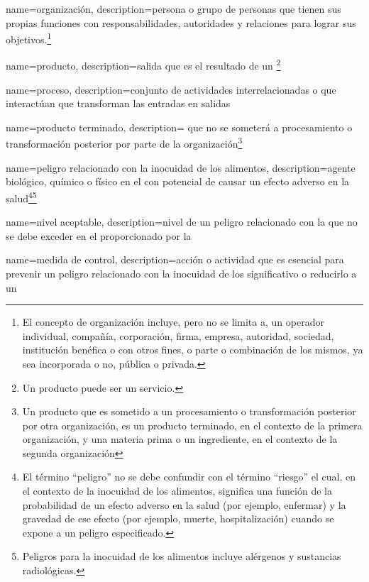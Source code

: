 {
    name=organización,
    description={persona o grupo de personas que tienen sus propias funciones con responsabilidades, autoridades y relaciones para lograr sus objetivos.\footnote{El concepto de organización incluye, pero no se limita a, un operador individual, compañía, corporación, firma, empresa, autoridad, sociedad, institución benéfica o con otros fines, o parte o combinación de los mismos, ya sea incorporada o no, pública o privada.}}
}

{
    name=producto,
    description={salida que es el resultado de un \footnote{Un producto puede ser un servicio.}}
}

{
    name=proceso,
    description={conjunto de actividades interrelacionadas o que interactúan que transforman las entradas en salidas}
}

{
    name=producto terminado,
    description={ que no se someterá a procesamiento o transformación posterior por parte de la organización\footnote{Un producto que es sometido a un procesamiento o transformación posterior por otra organización, es un producto terminado, en el contexto de la primera organización, y una materia prima o un ingrediente, en el contexto de la segunda organización}}
}

{
    name={peligro relacionado con la inocuidad de los alimentos},
    description={agente biológico, químico o físico en el  con potencial de causar un efecto adverso en la salud\footnote{El término “peligro” no se debe confundir con el término “riesgo” el cual, en el contexto de la inocuidad de los alimentos, significa una función de la probabilidad de un efecto adverso en la salud (por ejemplo, enfermar) y la gravedad de ese efecto (por ejemplo, muerte, hospitalización) cuando se expone a un peligro especificado.}\footnote{Peligros para la inocuidad de los alimentos incluye alérgenos y sustancias radiológicas.}}
}

{
    name={nivel aceptable},
    description={nivel de un peligro relacionado con la  que no se debe exceder en el  proporcionado por la }
}

{
    name={medida de control},
    description={acción o actividad que es esencial para prevenir un peligro relacionado con la inocuidad de los   significativo o reducirlo a un }
}


